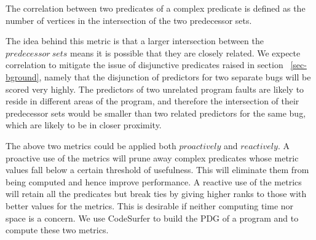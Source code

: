 \begin{defn}
\label{dfn5}
The correlation between two predicates of a complex predicate is defined as the number of vertices in the intersection of the two predecessor sets.
\end{defn}

The idea behind this metric is that a larger intersection between the $predecessor\ sets$ means it is possible that they are closely related.  We expecte correlation to mitigate the issue of disjunctive predicates raised in section ~\ref{sec-bground}, namely that the disjunction of predictors for two separate bugs will be scored very highly.  The predictors of two unrelated program faults are likely to reside in different areas of the program, and therefore the intersection of their predecessor sets would be smaller than two related predictors for the same bug, which are likely to be in closer proximity.

The above two metrics could be applied both $proactively$ and $reactively$.  A proactive use of the metrics will prune away complex predicates whose metric values fall below a certain threshold of usefulness.  This will eliminate them from being computed and hence improve performance.  A reactive use of the metrics will retain all the predicates but break ties by giving higher ranks to those with better values for the metrics. This is desirable if neither computing time nor space is a concern.  We use CodeSurfer to build the PDG of a program and to compute these two metrics.

